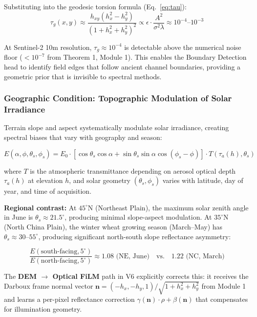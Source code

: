 Substituting into the geodesic torsion formula (Eq.~\ref{eq:tau}):
\begin{equation}
    \tau_g(x,y) \approx \frac{h_{xy}(h_x^2 - h_y^2)}{(1 + h_x^2 + h_y^2)^2}
    \propto \epsilon \cdot \frac{A^2}{\sigma^2 \lambda}
    \approx 10^{-4} \text{--} 10^{-3}
\end{equation}

At Sentinel-2 10m resolution, $\tau_g \approx 10^{-4}$ is detectable above the
numerical noise floor ($<10^{-7}$ from Theorem 1, Module 1). This enables the
Boundary Detection head to identify field edges that follow ancient channel
boundaries, providing a geometric prior that is invisible to spectral methods.

\subsubsection{Geographic Condition: Topographic Modulation of Solar Irradiance}

Terrain slope and aspect systematically modulate solar irradiance, creating
spectral biases that vary with geography and season:

\begin{equation}\label{eq:irradiance}
    E(\alpha, \phi, \theta_s, \phi_s) = E_0 \cdot
    \left[\cos\theta_s \cos\alpha +
    \sin\theta_s \sin\alpha \cos(\phi_s - \phi)\right] \cdot
    T(\tau_a(h), \theta_s)
\end{equation}

where $T$ is the atmospheric transmittance depending on aerosol optical depth
$\tau_a(h)$ at elevation $h$, and solar geometry $(\theta_s, \phi_s)$ varies
with latitude, day of year, and time of acquisition.

\textbf{Regional contrast:} At $45^\circ$N (Northeast Plain), the maximum
solar zenith angle in June is $\theta_s \approx 21.5^\circ$, producing minimal
slope-aspect modulation. At $35^\circ$N (North China Plain), the winter
wheat growing season (March--May) has $\theta_s \approx 30\text{--}55^\circ$,
producing significant north-south slope reflectance asymmetry:

\begin{equation}
    \frac{E(\text{south-facing}, 5^\circ)}{E(\text{north-facing}, 5^\circ)}
    \approx 1.08 \text{ (NE, June)} \quad \text{vs.} \quad
    1.22 \text{ (NC, March)}
\end{equation}

The \textbf{DEM $\to$ Optical FiLM} path in V6 explicitly corrects this:
it receives the Darboux frame normal vector $\mathbf{n} = (-h_x, -h_y, 1) /
\sqrt{1 + h_x^2 + h_y^2}$ from Module 1 and learns a per-pixel reflectance
correction $\gamma(\mathbf{n}) \cdot \rho + \beta(\mathbf{n})$ that
compensates for illumination geometry.

